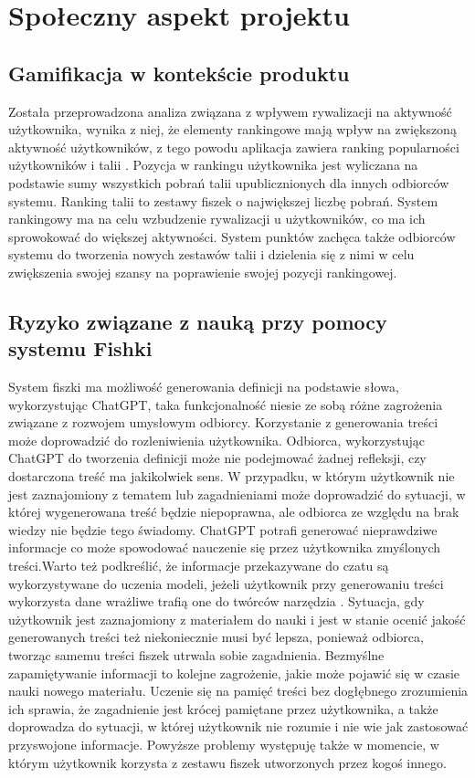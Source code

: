 \chapter{Społeczny aspekt projektu}

\section{Gamifikacja w kontekście produktu}
Została przeprowadzona analiza związana z wpływem rywalizacji na aktywność użytkownika, wynika z niej, że elementy rankingowe mają wpływ na zwiększoną aktywność użytkowników, z tego powodu aplikacja zawiera ranking popularności użytkowników i talii \cite{ablyGamification}. Pozycja w rankingu użytkownika jest wyliczana na podstawie sumy wszystkich pobrań talii upublicznionych dla innych odbiorców systemu. Ranking talii to zestawy fiszek o największej liczbę pobrań. System rankingowy ma na celu wzbudzenie rywalizacji u użytkowników, co ma ich sprowokować do większej aktywności. System punktów zachęca także odbiorców systemu do tworzenia nowych zestawów talii i dzielenia się z nimi w celu zwiększenia swojej szansy na poprawienie swojej pozycji rankingowej.


\section{Ryzyko związane z nauką przy pomocy systemu Fishki}
System fiszki ma możliwość generowania definicji na podstawie słowa, wykorzystując ChatGPT, taka funkcjonalność niesie ze sobą różne zagrożenia związane z rozwojem umysłowym odbiorcy. Korzystanie z generowania treści może doprowadzić do rozleniwienia użytkownika. Odbiorca, wykorzystując ChatGPT do tworzenia definicji może nie podejmować żadnej refleksji, czy dostarczona treść ma jakikolwiek sens. W przypadku, w którym użytkownik nie jest zaznajomiony z tematem lub zagadnieniami może doprowadzić do sytuacji, w której wygenerowana treść będzie niepoprawna, ale odbiorca ze względu na brak wiedzy nie będzie tego świadomy. ChatGPT potrafi generować nieprawdziwe informacje co może spowodować nauczenie się przez użytkownika zmyślonych treści.Warto też podkreślić, że informacje przekazywane do czatu są wykorzystywane do uczenia modeli, jeżeli użytkownik przy generowaniu treści wykorzysta dane wrażliwe trafią one do twórców narzędzia \cite{chatGptRisk}. Sytuacja, gdy użytkownik jest zaznajomiony z materiałem do nauki i jest w stanie ocenić jakość generowanych treści też niekoniecznie musi być lepsza, ponieważ odbiorca, tworząc samemu treści fiszek utrwala sobie zagadnienia. Bezmyślne zapamiętywanie informacji to kolejne zagrożenie, jakie może pojawić się w czasie nauki nowego materiału. Uczenie się na pamięć treści bez dogłębnego zrozumienia ich sprawia, że zagadnienie jest krócej pamiętane przez użytkownika, a także doprowadza do sytuacji, w której użytkownik nie rozumie i nie wie jak zastosować przyswojone informacje. Powyższe problemy występuję także w momencie, w którym użytkownik korzysta z zestawu fiszek utworzonych przez kogoś innego.
